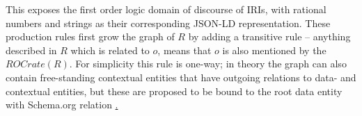 This exposes the first order logic domain of discourse of IRIs, with rational numbers and strings as their corresponding JSON-LD representation. These production rules first grow the graph of $R$ by adding a transitive rule – anything described in $R$ which is related to $o$, means that $o$ is also mentioned by the $ROCrate(R)$. For simplicity this rule is one-way; in theory the graph can also contain free-standing contextual entities that have outgoing relations to data- and contextual entities, but these are proposed to be bound to the root data entity with Schema.org relation \href{http://schema.org/mentions}.
